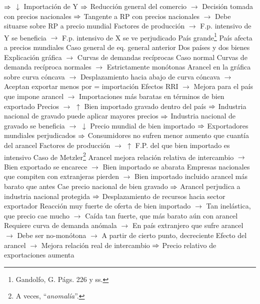 \documentclass{nuevotema}
\begin{document}
\begin{esquemal}
				\4[] $\Rightarrow$ $\downarrow$ Importación de Y
				\4[] $\Rightarrow$ Reducción general del comercio
				\4[] $\to$ Decisión tomada con precios nacionales
				\4[] $\Rightarrow$ Tangente a RP con precios nacionales
				\4[] $\to$ Debe situarse sobre RP a precio mundial
				\4[] Factores de producción
				\4[] $\to$ F.p. intensivo de Y se beneficia
				\4[] $\to$ F.p. intensivo de X se ve perjudicado
			\3 País grande\footnote{Gandolfo, G. Págs. 226 y ss.}
				\4 País afecta a precios mundiales
				\4[] Caso general de eq. general anterior
				\4[] Dos países y dos bienes
				\4[] Explicación gráfica
				\4[] $\to$ Curvas de demandas recíprocas
				\4 Caso normal
				\4[] 
				\4[] Curvas de demanda recíproca normales
				\4[] $\to$ Estrictamente monótonas
				\4[] Arancel en la gráfica sobre curva cóncava
				\4[] $\to$ Desplazamiento hacia abajo de curva cóncava
				\4[] $\to$ Aceptan exportar menos por = importación
				\4 Efectos
				\4[] RRI
				\4[] $\to$ Mejora para el país que impone arancel
				\4[] $\to$ Importaciones más baratas en términos de bien exportado
				\4[] Precios
				\4[] $\to$ $\uparrow$ Bien importado gravado dentro del país
				\4[] $\Rightarrow$ Industria nacional de gravado puede aplicar mayores precios
				\4[] $\Rightarrow$ Industria nacional de gravado se beneficia
				\4[] $\to$ $\downarrow$ Precio mundial de bien importado
				\4[] $\Rightarrow$ Exportadores mundiales perjudicados
				\4[] $\Rightarrow$ Consumidores no sufren menor aumento que cuantía del arancel
				\4[] Factores de producción
				\4[] $\to$ $\uparrow$ F.P. del que bien importado es intensivo
				\4 Caso de Metzler\footnote{A veces, ``\textit{anomalía}''.}
				\4[] 
				\4[] Arancel mejora relación relativa de intercambio
				\4[] $\to$ Bien exportado se encarece
				\4[] $\to$ Bien importado se abarata
				\4[] Empresas nacionales que compiten con extranjeras pierden
				\4[] $\to$ Bien importado incluido arancel más barato que antes
				\4[] Cae precio nacional de bien gravado
				\4[] $\Rightarrow$ Arancel perjudica a industria nacional protegida
				\4[] $\Rightarrow$ Desplazamiento de recursos hacia sector exportador
				\4[] Reacción muy fuerte de oferta de bien importado
				\4[] $\to$ Tan inelástica, que precio cae mucho
				\4[] $\to$ Caída tan fuerte, que más barato aún con arancel
				\4[] Requiere curva de demanda anómala
				\4[] $\to$ En país extranjero que sufre arancel
				\4[] $\to$ Debe ser no-monótona
				\4[] $\to$ A partir de cierto punto, decreciente
				\4[] Efecto del arancel
				\4[] $\to$ Mejora relación real de intercambio
				\4[] $\Rightarrow$ Precio relativo de exportaciones aumenta

\end{esquemal}
\end{document}
